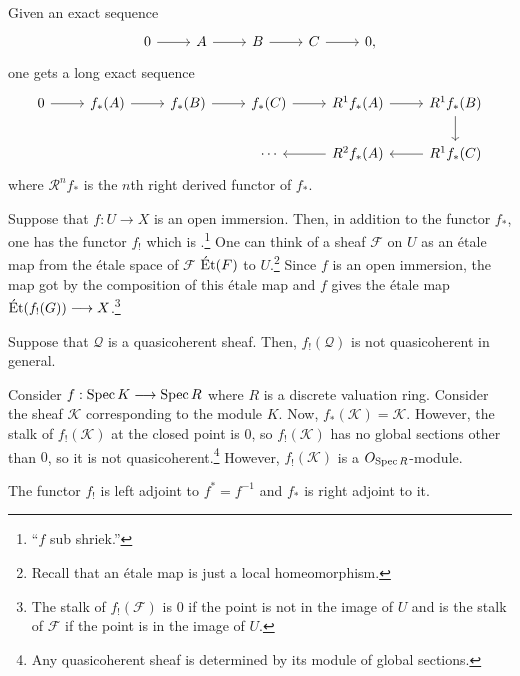\documentclass [11 pt, oneside] {article}
\begin{document}
Given an exact sequence
\[
\begin{tikzcd}
	0\ar[r]&\mathscr{A}\ar[r]&\mathscr{B}\ar[r]&\mathscr{C}\ar[r]&0,
\end{tikzcd}
\]
one gets a long exact sequence
\[
\begin{tikzcd}
	 0\ar[r] &f_*(\mathscr{A}) \ar[r]& f_*(\mathscr{B})\ar[r]&f_*(\mathscr{C}) \ar[r]&\mathscr{R}^1f_*(\mathscr{A}) \ar[r]&\mathscr{R}^1f_*(\mathscr{B}) \ar[d]\\&&&\cdots&\mathscr{R}^2f_*(\mathscr{A}) \ar[l]&\mathscr{R}^1f_*(\mathscr{C})\ar[l]
\end{tikzcd}
\]
where $\mathscr{R}^nf_*$ is the $n$th right derived functor of $f_*$. 

Suppose that $f:U\longrightarrow X$ is an open immersion. Then, in addition to the functor $f_*$, one has the functor $f_!$ which is .\footnote{``$f$ sub shriek.''} One can think of a sheaf $\mathscr{F}$ on $U$ as an \'etale map from the \'etale space of $\mathscr{F}$ $\operatorname{\acute Et}(\relax{F})$ to $U$.\footnote{Recall that an \'etale map is just a local homeomorphism.} Since $f$ is an open immersion, the map got by the composition of this \'etale map and $f$ gives the \'etale map $\operatorname{\acute Et}(f_!(\relax{G}))\longrightarrow X$.\footnote{The stalk of $f_!(\mathscr{F})$ is $0$ if the point is not in the image of $U$ and is the stalk of $\mathscr{F}$ if the point is in the image of $U$.}

Suppose that $\mathscr{Q}$ is a quasicoherent sheaf. Then, $f_!(\mathscr{Q})$ is not quasicoherent in general.

\begin{example}[ ]\label{}\text{}
Consider $f:\operatorname{Spec} K\longrightarrow \operatorname{Spec} R$ where $R$ is a discrete valuation ring. Consider the sheaf $\mathscr{K}$ corresponding to the module $K$. Now, $f_*(\mathscr{K}) =\mathscr{K}$. However, the stalk of $f_!(\mathscr{K}) $ at the closed point is $0$, so $f_!(\mathscr{K})$ has no global sections other than $0$, so it is not quasicoherent.\footnote{Any quasicoherent sheaf is determined by its module of global sections.} However, $f_!(\mathscr{K})$ is a $\relax{O}_{\operatorname{Spec} R}$-module.
\end{example}

The functor $f_!$ is left adjoint to $f^*=f^{-1}$ and $f_*$ is right adjoint to it.
\end{document}
